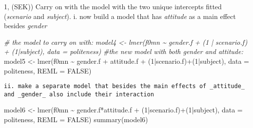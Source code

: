 \documentclass[
]{article}
\newenvironment{Shaded}{\begin{snugshade}}{\end{snugshade}}
\newcommand{\AttributeTok}[1]{\textcolor[rgb]{0.77,0.63,0.00}{#1}}
\newcommand{\CommentTok}[1]{\textcolor[rgb]{0.56,0.35,0.01}{\textit{#1}}}
\newcommand{\ConstantTok}[1]{\textcolor[rgb]{0.00,0.00,0.00}{#1}}
\newcommand{\DecValTok}[1]{\textcolor[rgb]{0.00,0.00,0.81}{#1}}
\newcommand{\FunctionTok}[1]{\textcolor[rgb]{0.00,0.00,0.00}{#1}}
\newcommand{\NormalTok}[1]{#1}
\newcommand{\OtherTok}[1]{\textcolor[rgb]{0.56,0.35,0.01}{#1}}
\newcommand{\SpecialCharTok}[1]{\textcolor[rgb]{0.00,0.00,0.00}{#1}}
\begin{document}
1, (SEK)) Carry on with the model with the two unique intercepts fitted
(\emph{scenario} and \emph{subject}). i. now build a model that has
\emph{attitude} as a main effect besides \emph{gender}

\begin{Shaded}
\begin{Highlighting}[]
\CommentTok{\# the model to carry on with: model4 \textless{}{-} lmer(f0mn \textasciitilde{} gender.f + (1 | scenario.f) + (1|subject), data = politeness)}
\CommentTok{\#the new model with both gender and attitude: }
\NormalTok{model5 }\OtherTok{\textless{}{-}} \FunctionTok{lmer}\NormalTok{(f0mn }\SpecialCharTok{\textasciitilde{}}\NormalTok{ gender.f }\SpecialCharTok{+}\NormalTok{ attitude.f }\SpecialCharTok{+}\NormalTok{ (}\DecValTok{1}\SpecialCharTok{|}\NormalTok{scenario.f)}\SpecialCharTok{+}\NormalTok{(}\DecValTok{1}\SpecialCharTok{|}\NormalTok{subject), }\AttributeTok{data =}\NormalTok{ politeness, }\AttributeTok{REML =} \ConstantTok{FALSE}\NormalTok{)}
\end{Highlighting}
\end{Shaded}

\begin{verbatim}
ii. make a separate model that besides the main effects of _attitude_ and _gender_ also include their interaction
\end{verbatim}

\begin{Shaded}
\begin{Highlighting}[]
\NormalTok{model6 }\OtherTok{\textless{}{-}} \FunctionTok{lmer}\NormalTok{(f0mn }\SpecialCharTok{\textasciitilde{}}\NormalTok{ gender.f}\SpecialCharTok{*}\NormalTok{attitude.f }\SpecialCharTok{+}\NormalTok{ (}\DecValTok{1}\SpecialCharTok{|}\NormalTok{scenario.f)}\SpecialCharTok{+}\NormalTok{(}\DecValTok{1}\SpecialCharTok{|}\NormalTok{subject), }\AttributeTok{data =}\NormalTok{ politeness, }\AttributeTok{REML =} \ConstantTok{FALSE}\NormalTok{)}
\FunctionTok{summary}\NormalTok{(model6)}
\end{Highlighting}
\end{Shaded}
\end{document}
